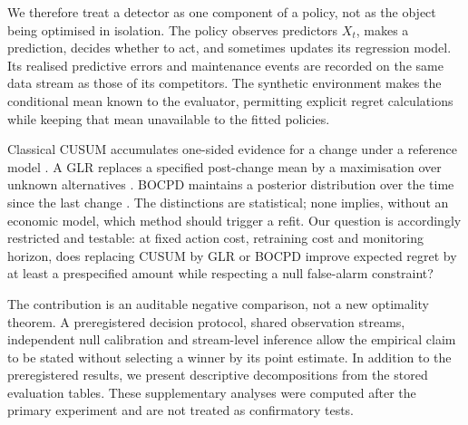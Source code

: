 \documentclass[11pt,a4paper]{article}
\begin{document}
We therefore treat a detector as one component of a policy, not as the object being optimised in isolation. The policy observes predictors $X_t$, makes a prediction, decides whether to act, and sometimes updates its regression model. Its realised predictive errors and maintenance events are recorded on the same data stream as those of its competitors. The synthetic environment makes the conditional mean known to the evaluator, permitting explicit regret calculations while keeping that mean unavailable to the fitted policies.

Classical CUSUM accumulates one-sided evidence for a change under a reference model \cite{page1954,lorden1971}. A GLR replaces a specified post-change mean by a maximisation over unknown alternatives \cite{basseville1993}. BOCPD maintains a posterior distribution over the time since the last change \cite{adams2007}. The distinctions are statistical; none implies, without an economic model, which method should trigger a refit. Our question is accordingly restricted and testable: at fixed action cost, retraining cost and monitoring horizon, does replacing CUSUM by GLR or BOCPD improve expected regret by at least a prespecified amount while respecting a null false-alarm constraint?

The contribution is an auditable negative comparison, not a new optimality theorem. A preregistered decision protocol, shared observation streams, independent null calibration and stream-level inference allow the empirical claim to be stated without selecting a winner by its point estimate. In addition to the preregistered results, we present descriptive decompositions from the stored evaluation tables. These supplementary analyses were computed after the primary experiment and are not treated as confirmatory tests.
\end{document}
